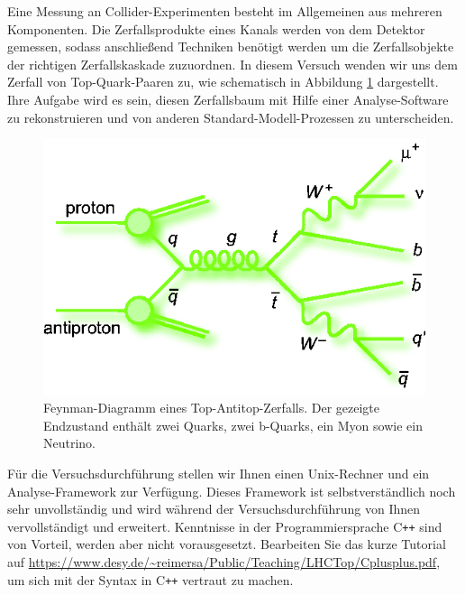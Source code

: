 	Eine Messung an Collider-Experimenten besteht im Allgemeinen aus mehreren Komponenten. Die Zerfallsprodukte eines Kanals werden von dem Detektor gemessen, sodass anschlie\ss{}end Techniken ben\"otigt werden um die Zerfallsobjekte der richtigen Zerfallskaskade zuzuordnen. In diesem Versuch wenden wir uns dem Zerfall von Top-Quark-Paaren zu, wie schematisch in Abbildung \ref{ttbarsemilep} dargestellt. Ihre Aufgabe wird es sein, diesen Zerfallsbaum mit Hilfe einer Analyse-Software zu rekonstruieren und von anderen Standard-Modell-Prozessen zu unterscheiden.
\begin{figure}[h]
\centerline{\includegraphics[scale=0.5]{pics_feynman_ttbar_mujets}}
\caption{Feynman-Diagramm eines Top-Antitop-Zerfalls. Der gezeigte Endzustand enth\"alt zwei Quarks, zwei b-Quarks, ein Myon sowie ein Neutrino.}
\label{ttbarsemilep}
\end{figure}

F\"ur die Versuchsdurchf\"uhrung stellen wir Ihnen einen Unix-Rechner und ein Analyse-Framework zur Verf\"ugung. Dieses Framework ist selbstverst\"andlich noch sehr
 unvollst\"andig und wird w\"ahrend der Versuchsdurchf\"uhrung von Ihnen vervollst\"andigt und erweitert. Kenntnisse in der Programmiersprache C\texttt{++} sind von Vorteil, 
werden aber nicht vorausgesetzt. Bearbeiten Sie das kurze Tutorial auf
\url{https://www.desy.de/~reimersa/Public/Teaching/LHCTop/Cplusplus.pdf}, um sich mit der Syntax in C\texttt{++} vertraut zu machen.\\

